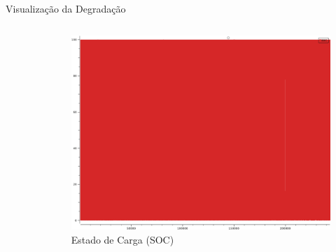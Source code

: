 \documentclass[aspectratio=169,xcolor=dvipsnames]{beamer}
\begin{document}
\begin{frame}{Visualização da Degradação}
\begin{columns}[T]
\begin{column}{0.33\textwidth}
\begin{figure}
      \end{figure}
    \end{column}
    \begin{column}{0.33\textwidth}
      \centering
      \begin{figure}
        \includegraphics[width=\textwidth]{logos/SOC.png}
        \caption{Estado de Carga (SOC)}
      \end{figure}
    \end{column}
  \end{columns}
\end{frame}
\end{document}
